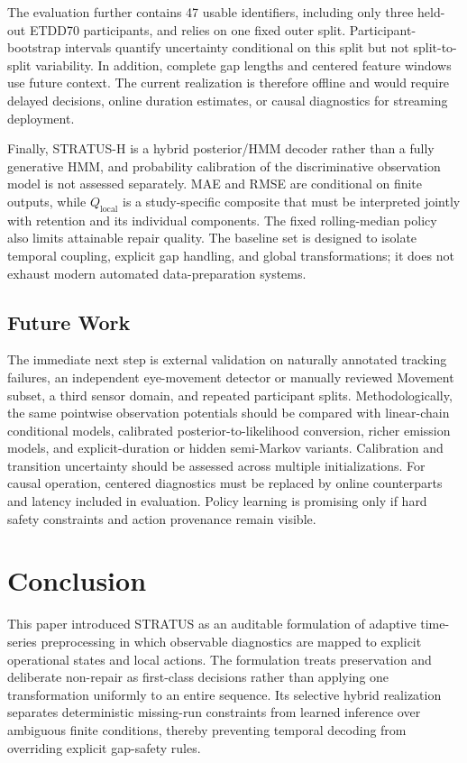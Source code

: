 \documentclass[sigconf,review]{acmart}
\newcommand{\STRATUS}{\textsc{STRATUS}\xspace}
\newcommand{\methodH}{\textsc{STRATUS-H}\xspace}
\begin{document}
The evaluation further contains 47 usable identifiers, including only three held-out ETDD70 participants, and relies on one fixed outer split. Participant-bootstrap intervals quantify uncertainty conditional on this split but not split-to-split variability. In addition, complete gap lengths and centered feature windows use future context. The current realization is therefore offline and would require delayed decisions, online duration estimates, or causal diagnostics for streaming deployment.

Finally, \methodH is a hybrid posterior/HMM decoder rather than a fully generative HMM, and probability calibration of the discriminative observation model is not assessed separately. MAE and RMSE are conditional on finite outputs, while $Q_{\mathrm{local}}$ is a study-specific composite that must be interpreted jointly with retention and its individual components. The fixed rolling-median policy also limits attainable repair quality. The baseline set is designed to isolate temporal coupling, explicit gap handling, and global transformations; it does not exhaust modern automated data-preparation systems.

\subsection{Future Work}

The immediate next step is external validation on naturally annotated tracking failures, an independent eye-movement detector or manually reviewed Movement subset, a third sensor domain, and repeated participant splits. Methodologically, the same pointwise observation potentials should be compared with linear-chain conditional models, calibrated posterior-to-likelihood conversion, richer emission models, and explicit-duration or hidden semi-Markov variants. Calibration and transition uncertainty should be assessed across multiple initializations. For causal operation, centered diagnostics must be replaced by online counterparts and latency included in evaluation. Policy learning is promising only if hard safety constraints and action provenance remain visible.

\section{Conclusion}
\label{sec:conclusion}

This paper introduced \STRATUS as an auditable formulation of adaptive
time-series preprocessing in which observable diagnostics are mapped to
explicit operational states and local actions. The formulation treats
preservation and deliberate non-repair as first-class decisions rather
than applying one transformation uniformly to an entire sequence. Its
selective hybrid realization separates deterministic missing-run
constraints from learned inference over ambiguous finite conditions,
thereby preventing temporal decoding from overriding explicit gap-safety
rules.
\end{document}

